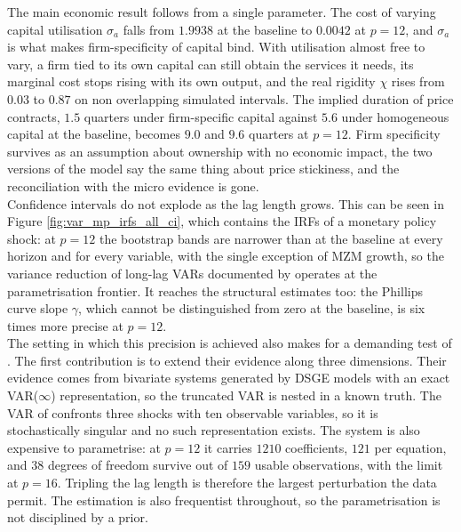 \documentclass[12pt, a4paper]{article}
\begin{document}
The main economic result follows from a single parameter. The cost of varying capital utilisation
$\sigma_a$ falls from $1.9938$ at the baseline to $0.0042$ at $p = 12$, and $\sigma_a$ is what makes
firm-specificity of capital bind. With utilisation almost free to vary, a firm tied to its own capital can
still obtain the services it needs, its marginal cost stops rising with its own output, and the real
rigidity $\chi$ rises from $0.03$ to $0.87$ on non overlapping simulated intervals. The implied
duration of price contracts, $1.5$ quarters under firm-specific capital against $5.6$ under
homogeneous capital at the baseline, becomes $9.0$ and $9.6$ quarters at $p = 12$. Firm specificity
survives as an assumption about ownership with no economic impact, the two versions of the model
say the same thing about price stickiness, and the reconciliation with the micro evidence is gone.
\\

Confidence intervals do not explode as the lag length grows. This can be seen in Figure \ref{fig:var_mp_irfs_all_ci}, 
which contains the IRFs of a monetary policy shock: at $p = 12$ the bootstrap bands are
narrower than at the baseline at every horizon and for every variable, with the single exception of
MZM growth, so the variance reduction of long-lag VARs documented by \citet{Long_Lag2025} operates at the
parametrisation frontier. It reaches the structural estimates too: the Phillips curve slope
$\gamma$, which cannot be distinguished from zero at the baseline, is six times more precise at
$p = 12$.
\\

The setting in which this precision is achieved also makes for a demanding test of \citet{Long_Lag2025}.
The first contribution is to extend their evidence along three dimensions. Their evidence comes from
bivariate systems generated by DSGE models with an exact VAR($\infty$) representation, so the
truncated VAR is nested in a known truth. The VAR of \citet{ACEL2011} confronts three shocks with
ten observable variables, so it is stochastically singular and no such representation exists. The
system is also expensive to parametrise: at $p = 12$ it carries $1210$ coefficients, $121$ per
equation, and $38$ degrees of freedom survive out of $159$ usable observations, with the limit at
$p = 16$. Tripling the lag length is therefore the largest perturbation the data permit. The
estimation is also frequentist throughout, so the parametrisation is not disciplined by a prior.
\\
\end{document}
